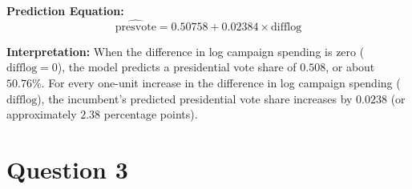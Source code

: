 \documentclass[12pt,letterpaper]{article}
\begin{document}
\begin{enumerate}
		\textbf{Prediction Equation:}
		$$\widehat{\text{presvote}} = 0.50758 + 0.02384 \times \text{difflog}$$
		
		
		
		\textbf{Interpretation:} 	
		When the difference in log campaign spending is zero ($\text{difflog} = 0$), the model predicts a presidential vote share of $0.508$, or about $50.76\%$. For every one-unit increase in the difference in log campaign spending ($\text{difflog}$), the incumbent's predicted presidential vote share increases by $0.0238$ (or approximately $2.38$ percentage points). 
	\end{enumerate}
	
	\newpage	
	\section*{Question 3}
	
\end{document}
